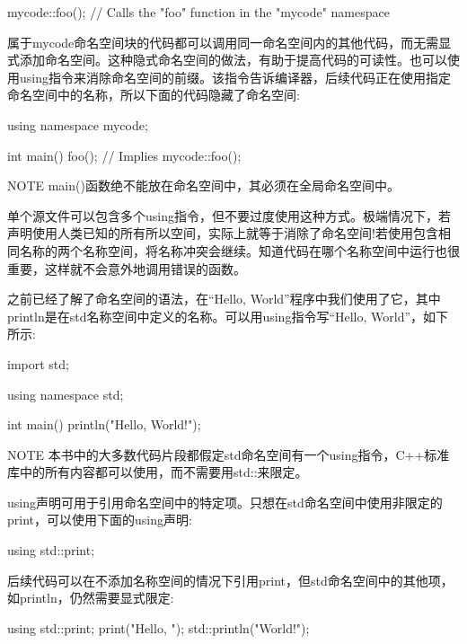\begin{cpp}
mycode::foo(); // Calls the "foo" function in the "mycode" namespace
\end{cpp}

属于mycode命名空间块的代码都可以调用同一命名空间内的其他代码，而无需显式添加命名空间。这种隐式命名空间的做法，有助于提高代码的可读性。也可以使用using指令来消除命名空间的前缀。该指令告诉编译器，后续代码正在使用指定命名空间中的名称，所以下面的代码隐藏了命名空间:

\begin{cpp}
using namespace mycode;

int main()
{
    foo(); // Implies mycode::foo();
}
\end{cpp}

\begin{myNotic}{NOTE}
main()函数绝不能放在命名空间中，其必须在全局命名空间中。
\end{myNotic}

单个源文件可以包含多个using指令，但不要过度使用这种方式。极端情况下，若声明使用人类已知的所有所以空间，实际上就等于消除了命名空间!若使用包含相同名称的两个名称空间，将名称冲突会继续。知道代码在哪个名称空间中运行也很重要，这样就不会意外地调用错误的函数。

之前已经了解了命名空间的语法，在“Hello, World”程序中我们使用了它，其中println是在std名称空间中定义的名称。可以用using指令写“Hello, World”，如下所示:

\begin{cpp}
import std;

using namespace std;

int main()
{
    println("Hello, World!");
}
\end{cpp}

\begin{myNotic}{NOTE}
本书中的大多数代码片段都假定std命名空间有一个using指令，C++标准库中的所有内容都可以使用，而不需要用std::来限定。
\end{myNotic}

using声明可用于引用命名空间中的特定项。只想在std命名空间中使用非限定的print，可以使用下面的using声明:

\begin{cpp}
using std::print;
\end{cpp}

后续代码可以在不添加名称空间的情况下引用print，但std命名空间中的其他项，如println，仍然需要显式限定:

\begin{cpp}
using std::print;
print("Hello, ");
std::println("World!");
\end{cpp}

